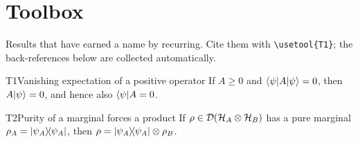 \documentclass[11pt,a4paper,oneside,open=any,numbers=noenddot]{scrbook}
\begin{document}









































\appendix
\cleardoublepage
\chapter{Toolbox}

\noindent
Results that have earned a name by recurring. Cite them with \verb|\usetool{T1}|;
the back-references below are collected automatically.

\medskip

\begin{tool}{T1}{Vanishing expectation of a positive operator}
If $A \geq 0$ and $\langle \psi \vert A \vert \psi \rangle = 0$, then $A\lvert \psi \rangle = 0$, and hence also
$\langle \psi \rvert A = 0$.
\end{tool}

\begin{tool}{T2}{Purity of a marginal forces a product}
If $\rho \in \mathcal{D}\!\left(\mathcal{H}_A \otimes \mathcal{H}_B\right)$ has a pure marginal
$\rho_A = \lvert \psi_A \rangle\!\langle \psi_A \rvert$, then $\rho = \lvert \psi_A \rangle\!\langle \psi_A \rvert \otimes \rho_B$.
\end{tool}
\end{document}
